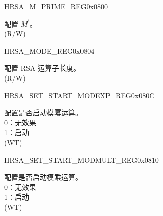 \begin{register}{H}{RSA\_M\_PRIME\_REG}{0x0800}\label{regdesc:RSAMPRIMEREG}
%
\regnewline%
\begin{regdesc}\begin{reglist}
\label{fielddesc:RSAMPRIME}\item [RSA\_M\_PRIME] 配置 \begin{math}M^{\prime}\end{math}。\\
(R/W)
\end{reglist}\end{regdesc}
\end{register}


\begin{register}{H}{RSA\_MODE\_REG}{0x0804}\label{regdesc:RSAMODEREG}
%
%
\regnewline%
\begin{regdesc}\begin{reglist}
\label{fielddesc:RSAMODE}\item [RSA\_MODE] 配置 RSA 运算子长度。\\
(R/W)
\end{reglist}\end{regdesc}
\end{register}


\begin{register}{H}{RSA\_SET\_START\_MODEXP\_REG}{0x080C}\label{regdesc:RSASETSTARTMODEXPREG}
%
%
\regnewline%
\begin{regdesc}\begin{reglist}
\label{fielddesc:RSASETSTARTMODEXP}\item [RSA\_SET\_START\_MODEXP] 配置是否启动模幂运算。\\
0：无效果\\
1：启动\\
(WT)
\end{reglist}\end{regdesc}
\end{register}


\begin{register}{H}{RSA\_SET\_START\_MODMULT\_REG}{0x0810}\label{regdesc:RSASETSTARTMODMULTREG}
%
%
\regnewline%
\begin{regdesc}\begin{reglist}
\label{fielddesc:RSASETSTARTMODMULT}\item [RSA\_SET\_START\_MODMULT] 配置是否启动模乘运算。\\
0：无效果\\
1：启动\\
(WT)
\end{reglist}\end{regdesc}
\end{register}



